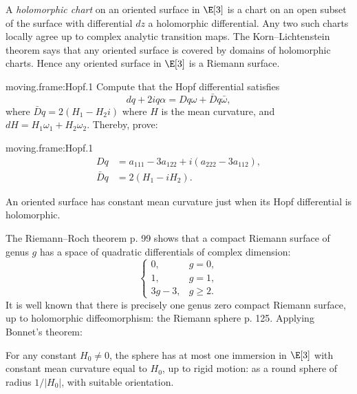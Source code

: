 A \emph{holomorphic chart} on an oriented surface in \(\E[3]\) is a chart on an open subset of the surface with differential \(dz\) a holomorphic differential.
Any two such charts locally agree up to complex analytic transition maps.
The Korn--Lichtenstein theorem says that any oriented surface is covered by domains of holomorphic charts.
Hence any oriented surface in \(\E[3]\) is a Riemann surface.
\begin{problem}{moving.frame:Hopf.1}
Compute that the Hopf differential satisfies
\[
dq+2iq\alpha = Dq \omega +  \bar{D}q \bar\omega,
\]
where
\(
\bar{D}q=
2(H_1-H_2i)
\)
where \(H\) is the mean curvature, and \(dH=H_1\omega_1+H_2\omega_2\).
Thereby, prove:
\end{problem}
\begin{answer}{moving.frame:Hopf.1}
\begin{align*}
Dq&=a_{111}-3a_{122}+i(a_{222}-3a_{112}),\\
\bar{D}q&=2(H_1-iH_2).
\end{align*}
\end{answer}
\begin{theorem}
An oriented surface has constant mean curvature just when its Hopf differential is holomorphic.
\end{theorem}
The Riemann--Roch theorem \cite{Griffiths:1989} p. 99 shows that a compact Riemann surface of genus \(g\) has a space of quadratic differentials of complex dimension: 
\[
\begin{cases}
0,&g=0,\\
1,&g=1,\\ 
3g-3,&g\ge 2.
\end{cases}
\]
It is well known that there is precisely one genus zero compact Riemann surface, up to holomorphic diffeomorphism: the Riemann sphere \cite{Griffiths:1989} p. 125.
Applying Bonnet's theorem:
\begin{corollary}
For any constant \(H_0\ne 0\), the sphere has at most one immersion in \(\E[3]\) with constant mean curvature equal to \(H_0\), up to rigid motion: as a round sphere of radius \(1/|H_0|\), with suitable orientation.
\end{corollary}

